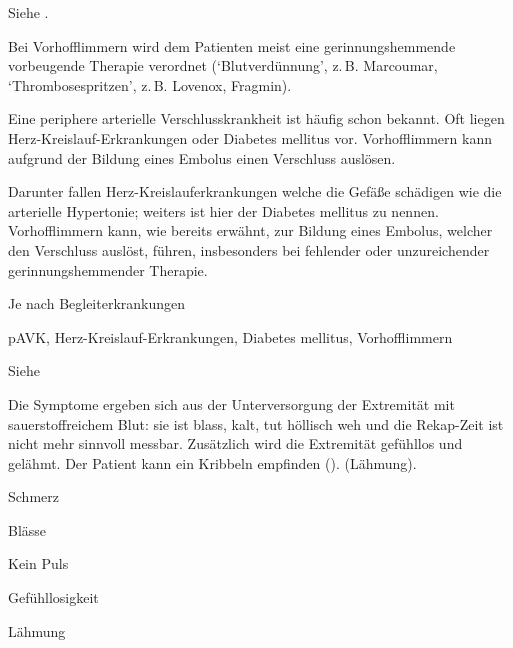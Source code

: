 \TextSlide
{{\TxSAMPLER}}
{
\begin{SAMPLERText}
  \item[\SAMPLER{S}] Siehe \TxABCDE.
  \item[\SAMPLER{M}] Bei Vorhofflimmern wird dem Patienten
  meist eine gerinnungshemmende vorbeugende Therapie
  verordnet (\enquote*{Blutverdünnung}, z.\,B.
  Marcoumar{\texttrademark}, \enquote*{Thrombosespritzen},
  z.\,B. Lovenox{\texttrademark}, Fragmin{\texttrademark}).
  \item[\SAMPLER{P}] Eine periphere arterielle
  Verschlusskrankheit ist häufig schon bekannt. Oft liegen
  Herz-Kreislauf-Erkrankungen oder Diabetes mellitus vor.
  Vorhofflimmern kann aufgrund der Bildung eines Embolus
  einen Verschluss auslösen.
  \item[\SAMPLER{R}] Darunter fallen
  Herz-Kreislauferkrankungen welche die Gefäße schädigen wie
  die arterielle Hypertonie; weiters ist hier der 
  Diabetes mellitus zu nennen.
  Vorhofflimmern kann, wie bereits erwähnt, zur Bildung
  eines Embolus, welcher den Verschluss auslöst, führen,
  insbesonders bei fehlender oder unzureichender
  gerinnungshemmender Therapie.
\end{SAMPLERText}
}
{
\begin{SAMPLERSlide}
  \item[\SAMPLER{S}] \TxABCDE
  \item[\SAMPLER{M}] Je nach Begleiterkrankungen
  \item[\SAMPLER{P}] pAVK, 
  Herz-Kreislauf-Erkrankungen, Diabetes mellitus, 
  Vorhofflimmern 
  \item[\SAMPLER{R}] Siehe 
\end{SAMPLERSlide}
}
{}
{}
{}

\TextSlide{\TxSymptome}
{%
Die Symptome ergeben sich aus der Unterversorgung der
Extremität mit sauerstoffreichem Blut: sie ist blass,
kalt, tut höllisch weh und die Rekap-Zeit ist nicht
mehr sinnvoll messbar. Zusätzlich wird die Extremität
gefühllos und gelähmt. Der Patient kann ein Kribbeln
empfinden (). (Lähmung).

}{%
\begin{compactitem}
  \item Schmerz
  \item Blässe
  \item Kein Puls
  \item Gefühllosigkeit
  \item Lähmung
\end{compactitem}
}{}{}{}


